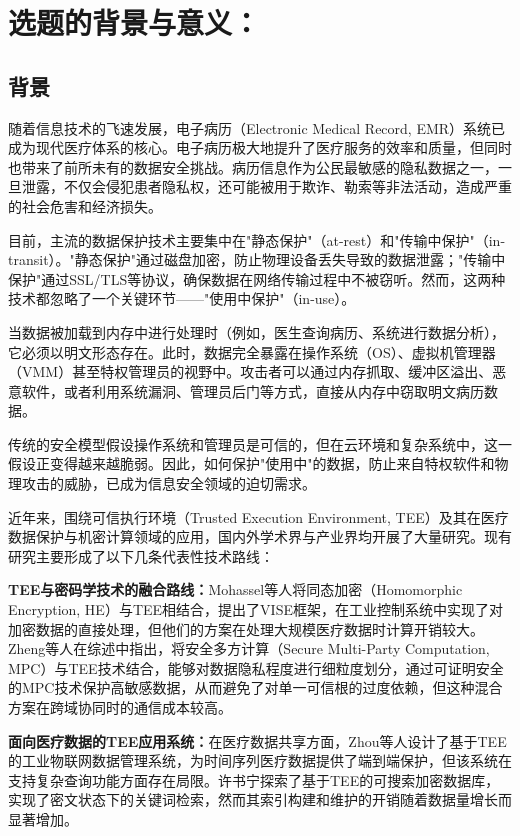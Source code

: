 \documentclass{article}
\begin{document}
\section{选题的背景与意义：}
\subsection*{背景}
随着信息技术的飞速发展，电子病历（Electronic Medical Record, EMR）系统已成为现代医疗体系的核心。电子病历极大地提升了医疗服务的效率和质量，但同时也带来了前所未有的数据安全挑战。病历信息作为公民最敏感的隐私数据之一，一旦泄露，不仅会侵犯患者隐私权，还可能被用于欺诈、勒索等非法活动，造成严重的社会危害和经济损失。

目前，主流的数据保护技术主要集中在"静态保护"（at-rest）和"传输中保护"（in-transit）。"静态保护"通过磁盘加密，防止物理设备丢失导致的数据泄露；"传输中保护"通过SSL/TLS等协议，确保数据在网络传输过程中不被窃听。然而，这两种技术都忽略了一个关键环节——"使用中保护"（in-use）。

当数据被加载到内存中进行处理时（例如，医生查询病历、系统进行数据分析），它必须以明文形态存在。此时，数据完全暴露在操作系统（OS）、虚拟机管理器（VMM）甚至特权管理员的视野中。攻击者可以通过内存抓取、缓冲区溢出、恶意软件，或者利用系统漏洞、管理员后门等方式，直接从内存中窃取明文病历数据。

传统的安全模型假设操作系统和管理员是可信的，但在云环境和复杂系统中，这一假设正变得越来越脆弱。因此，如何保护"使用中"的数据，防止来自特权软件和物理攻击的威胁，已成为信息安全领域的迫切需求\cite{ref9}。

近年来，围绕可信执行环境（Trusted Execution Environment, TEE）及其在医疗数据保护与机密计算领域的应用，国内外学术界与产业界均开展了大量研究。现有研究主要形成了以下几条代表性技术路线：

\textbf{TEE与密码学技术的融合路线：}Mohassel等人\cite{ref14}将同态加密（Homomorphic Encryption, HE）与TEE相结合，提出了VISE框架，在工业控制系统中实现了对加密数据的直接处理，但他们的方案在处理大规模医疗数据时计算开销较大。Zheng等人\cite{ref16}在综述中指出，将安全多方计算（Secure Multi-Party Computation, MPC）与TEE技术结合，能够对数据隐私程度进行细粒度划分，通过可证明安全的MPC技术保护高敏感数据，从而避免了对单一可信根的过度依赖，但这种混合方案在跨域协同时的通信成本较高。

\textbf{面向医疗数据的TEE应用系统：}在医疗数据共享方面，Zhou等人\cite{ref15}设计了基于TEE的工业物联网数据管理系统，为时间序列医疗数据提供了端到端保护，但该系统在支持复杂查询功能方面存在局限。许书宁\cite{ref2}探索了基于TEE的可搜索加密数据库，实现了密文状态下的关键词检索，然而其索引构建和维护的开销随着数据量增长而显著增加。
\end{document}
